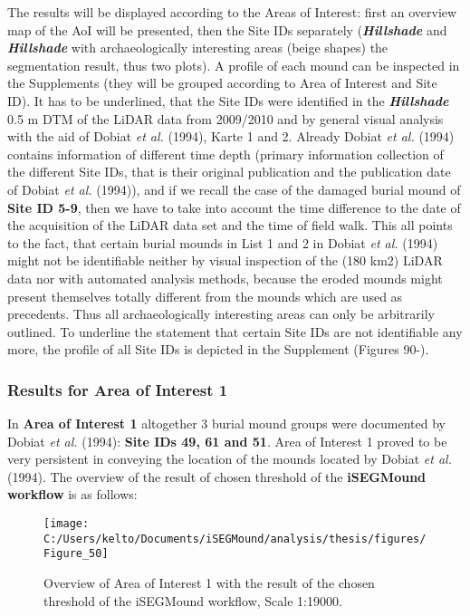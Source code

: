 \documentclass[
  12pt,
]{article}
\begin{document}
The results will be displayed according to the Areas of Interest: first an overview map of the AoI will be presented, then the Site IDs separately (\textbf{\emph{Hillshade}} and \textbf{\emph{Hillshade}} with archaeologically interesting areas (beige shapes) the segmentation result, thus two plots). A profile of each mound can be inspected in the Supplements (they will be grouped according to Area of Interest and Site ID).
It has to be underlined, that the Site IDs were identified in the \textbf{\emph{Hillshade}} 0.5 m DTM of the LiDAR data from 2009/2010 and by general visual analysis with the aid of Dobiat \emph{et al.} (1994), Karte 1 and 2. Already Dobiat \emph{et al.} (1994) contains information of different time depth (primary information collection of the different Site IDs, that is their original publication and the publication date of Dobiat \emph{et al.} (1994)), and if we recall the case of the damaged burial mound of \textbf{Site ID 5-9}, then we have to take into account the time difference to the date of the acquisition of the LiDAR data set and the time of field walk. This all points to the fact, that certain burial mounds in List 1 and 2 in Dobiat \emph{et al.} (1994) might not be identifiable neither by visual inspection of the (180 km2) LiDAR data nor with automated analysis methods, because the eroded mounds might present themselves totally different from the mounds which are used as precedents. Thus all archaeologically interesting areas can only be arbitrarily outlined.
To underline the statement that certain Site IDs are not identifiable any more, the profile of all Site IDs is depicted in the Supplement (Figures 90-).

\hypertarget{results-for-area-of-interest-1}{%
\subsubsection{\texorpdfstring{\textbf{Results for Area of Interest 1}}{Results for Area of Interest 1}}\label{results-for-area-of-interest-1}}

In \textbf{Area of Interest 1} altogether 3 burial mound groups were documented by Dobiat \emph{et al.} (1994): \textbf{Site IDs 49, 61 and 51}. Area of Interest 1 proved to be very persistent in conveying the location of the mounds located by Dobiat \emph{et al.} (1994). The overview of the result of chosen threshold of the \textbf{iSEGMound workflow} is as follows:

\begin{figure}

{\centering \texttt{[image: C:/Users/kelto/Documents/iSEGMound/analysis/thesis/figures/Figure\_50]} 

}

\caption{Overview of Area of Interest 1 with the result of the chosen threshold of the iSEGMound workflow, Scale 1:19000.}\label{fig:Figure50}
\end{figure}
\end{document}
